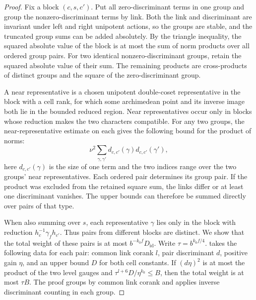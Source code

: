 \begin{proof}
Fix a block $(c,s,c')$. Put all zero-discriminant terms in one group
and group the nonzero-discriminant terms by link. Both the link and discriminant are invariant under left and right unipotent actions,
so the groups are stable, and the truncated group sums can be added absolutely.
By the triangle inequality, the squared absolute value of the block is at most the sum of norm products over all ordered group pairs.
For two identical nonzero-discriminant groups, retain the squared absolute value of their sum.
The remaining products are cross-products of distinct groups and the square of the zero-discriminant group.

A near representative is a chosen unipotent double-coset representative in the block with a cell rank,
for which some archimedean point and its inverse image both lie in the bounded reduced region.
Near representatives occur only in blocks whose reduction makes the two characters compatible.
For any two groups, the near-representative estimate on each gives the following bound for the product of norms:
\[
 \nu^2\sum_{\gamma,\gamma'}d_{c,c'}(\gamma)d_{c,c'}(\gamma'),
\]
here $d_{c,c'}(\gamma)$ is the size of one term and the two indices range over the two groups' near representatives.
Each ordered pair determines its group pair. If the product was excluded from the retained square sum,
the links differ or at least one discriminant vanishes.
The upper bounds can therefore be summed directly over pairs of that type.

When also summing over $s$, each representative $\gamma$ lies only in the block with reduction
$h_c^{-1}\gamma_f h_{c'}$. Thus pairs from different blocks are distinct.
We show that the total weight of these pairs is at most $b^{-k_0 f}D_{\mathrm{id}}$.
Write $\tau=b^{k_0 f/4}$.
 takes the following data for each pair:
common link corank $l$, pair discriminant $d$, positive gain $\eta$,
and an upper bound $D$ for both cell constants.
If $(d\eta)^2$ is at most the product of the two level gauges and
$\tau^{l+6}D/\eta^{k_0}\le B$, then the total weight is at most $\tau B$.
The proof groups by common link corank and applies inverse discriminant counting in each group.


\end{proof}
